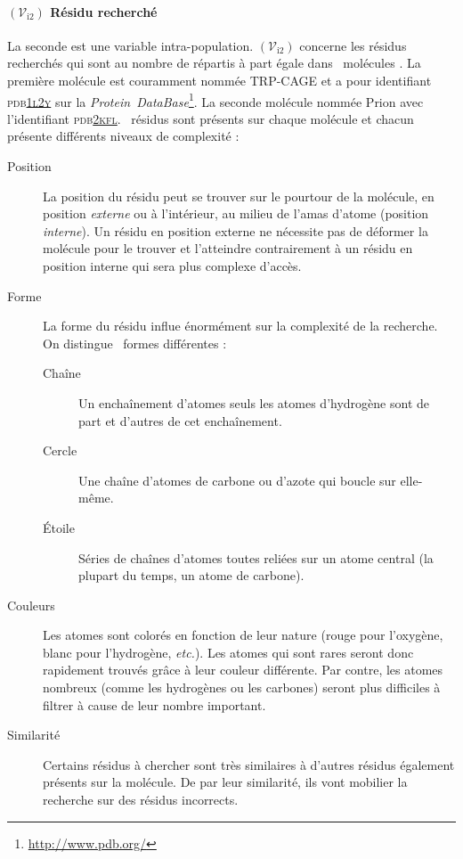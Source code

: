 \documentclass[myfrancais]{mythesis}
\newcommand{\mynum}[1]{\nombre{#1}}
\newcommand{\myvar}[2]{$\left(\mathcal{V}_{\mathrm{#1}#2}\right)$\xspace}
\newcommand{\myvari}[1]{\myvar{i}{#1}}
\newcommand{\myPDB}{\textsc{pdb}\xspace}
\newcommand{\myPDBbase}{\emph{Protein~DataBase}\xspace}
\newcommand{\myPDBlink}[2]{\href{#1}{\textsc{\MakeLowercase{#2}}}}
\newcommand{\TRPCAGE}{TRP-CAGE\xspace}
\newcommand{\Prion}{Prion\xspace}
\newcommand{\myemph}[1]{\emph{#1}}
\newcommand{\myetc}{\textit{etc.}\xspace}
\begin{document}
	\paragraph{\myvari{2} Résidu recherché}
	La seconde  est une variable intra-population.
	\myvari{2} concerne les résidus recherchés qui sont au nombre de \mynum{10} répartis à part égale dans \mynum{2}~molécules .
	La première molécule est couramment nommée \TRPCAGE {} et a pour identifiant \myPDB \myPDBlink{http://www.rcsb.org/pdb/explore/explore.do?structureId=1L2Y}{1L2Y} sur la \myPDBbase\footnote{\url{http://www.pdb.org/}}.
	La seconde molécule nommée \Prion {} avec l'identifiant \myPDB \myPDBlink{http://www.rcsb.org/pdb/explore/explore.do?structureId=2KFL}{2KFL}.
	\mynum{5}~résidus sont présents sur chaque molécule  et chacun présente différents niveaux de complexité  :
	\begin{description}
		\item[Position] La position du résidu peut se trouver sur le pourtour de la molécule, en position \myemph{externe} ou à l'intérieur, au milieu de l'amas d'atome (position \myemph{interne}).
			Un résidu en position externe ne nécessite pas de déformer la molécule pour le trouver et l'atteindre contrairement à un résidu en position interne qui sera plus complexe d'accès.
		\item[Forme] La forme du résidu influe énormément sur la complexité de la recherche.
			On distingue \mynum{3}~formes différentes :
			\begin{description}
				\item[Chaîne] Un enchaînement d'atomes seuls les atomes d'hydrogène sont de part et d'autres de cet enchaînement.
				\item[Cercle] Une chaîne d'atomes de carbone ou d'azote qui boucle sur elle-même.
				\item[Étoile] Séries de chaînes d'atomes toutes reliées sur un atome central (la plupart du temps, un atome de carbone).
			\end{description}
		\item[Couleurs] Les atomes sont colorés en fonction de leur nature (rouge pour l'oxygène, blanc pour l'hydrogène, \myetc).
			Les atomes qui sont rares seront donc rapidement trouvés grâce à leur couleur différente.
			Par contre, les atomes nombreux (comme les hydrogènes ou les carbones) seront plus difficiles à filtrer à cause de leur nombre important.
		\item[Similarité] Certains résidus à chercher sont très similaires à d'autres résidus également présents sur la molécule.
			De par leur similarité, ils vont mobilier la recherche sur des résidus incorrects.
	\end{description}
\end{document}
